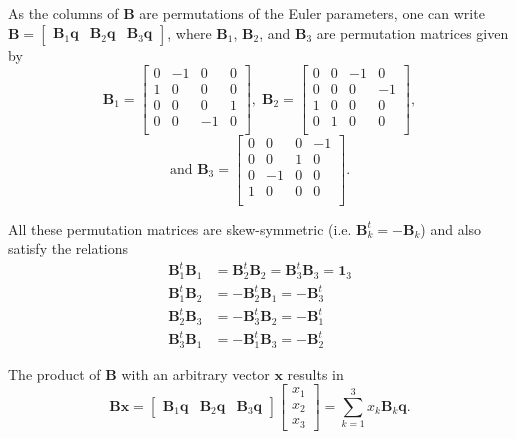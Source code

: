 \documentclass[aip,jcp,reprint,amsmath,amssymb,amsfont]{revtex4-1}
\newcommand{\mt}[1]{\boldsymbol{\mathbf{#1}}}           %
\newcommand{\vt}[1]{\boldsymbol{\mathbf{#1}}}           %
\newcommand{\tr}[1]{#1^t}                               %
\begin{document}
As the columns of $\mt B$ are permutations of the Euler parameters, one can write $\mt B = [\begin{array}{ccc}{\mt B}_1{\vt q} & {\mt B}_2{\vt q} & {\mt B}_3{\vt q}\end{array}]$, where $\mt B_1$, $\mt B_2$, and $\mt B_3$ are permutation matrices given by
\[
{\mt B}_1 = \left[ \begin{array}{rrrr}
 0 & -1 &  0 &  0 \\
 1 &  0 &  0 &  0 \\
 0 &  0 &  0 &  1 \\
 0 &  0 & -1 &  0 \\
\end{array} \right], \;
{\mt B}_2 = \left[ \begin{array}{rrrr}
 0 &  0 & -1 &  0 \\
 0 &  0 &  0 & -1 \\
 1 &  0 &  0 &  0 \\
 0 &  1 &  0 &  0 \\
\end{array} \right],
\]\[
\text{and }{\mt B}_3 = \left[ \begin{array}{rrrr}
 0 &  0 &  0 & -1 \\
 0 &  0 &  1 &  0 \\
 0 & -1 &  0 &  0 \\
 1 &  0 &  0 &  0 \\
\end{array} \right].
\]

All these permutation matrices are skew-symmetric (i.e. $\tr{\mt B_k} = -\mt B_k$) and also satisfy the relations\cite{Dichmann1999}
\begin{equation}
\label{eq:BB_products}
\begin{aligned}
\tr{\mt B_1}{\mt B_1} &= \tr{\mt B_2}{\mt B_2} = \tr{\mt B_3}{\mt B_3} = \mt 1_3 \\
\tr{\mt B_1}{\mt B_2} &= -\tr{\mt B_2}{\mt B_1} = -\tr{\mt B_3} \\
\tr{\mt B_2}{\mt B_3} &= -\tr{\mt B_3}{\mt B_2} = -\tr{\mt B_1} \\
\tr{\mt B_3}{\mt B_1} &= -\tr{\mt B_1}{\mt B_3} = -\tr{\mt B_2}
\end{aligned}
\end{equation}

The product of $\mt B$ with an arbitrary vector $\vt x$ results in
\begin{equation}
\label{eq:product_B_vector}
\mt B \vt x = \left[ \begin{array}{ccc} \mt B_1 \vt q & \mt B_2 \vt q & \mt B_3 \vt q \end{array}\right] \left[ \begin{array}{c} x_1 \\ x_2 \\ x_3 \end{array} \right] = \sum_{k=1}^3 x_k {\mt B}_k \vt q.
\end{equation}
\end{document}
